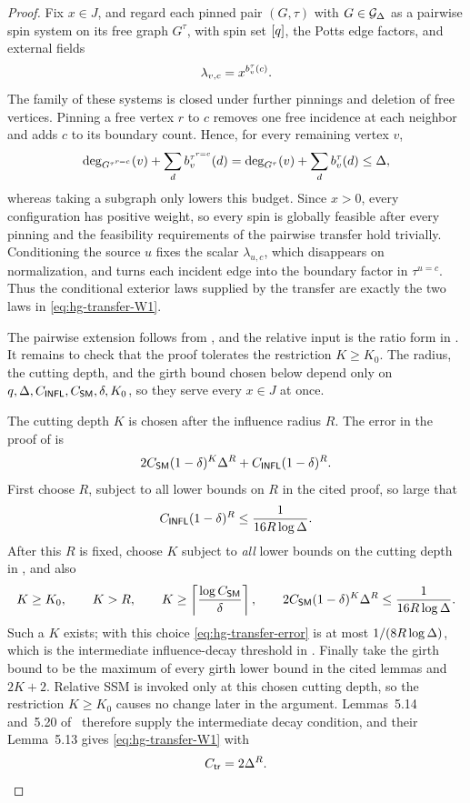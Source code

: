 \begin{proof}
Fix \(x\in J\), and regard each pinned pair \((G,\tau)\) with \(G\in\mathcal{G}_{\Delta}\) as
a pairwise spin system on its free graph \(G^\tau\), with spin set
\([q]\), the Potts edge factors, and external fields
\[
  \lambda_{v,c}=x^{b_v^\tau(c)}.
\]
The family of these systems is closed under further pinnings and deletion of
free vertices.  Pinning a free vertex $r$ to $c$ removes one free incidence at
each neighbor and adds $c$ to its boundary count.  Hence, for every remaining
vertex $v$,
\[
  \deg_{G^{\tau^{r=c}}}(v)
    +\sum_db_v^{\tau^{r=c}}(d)
  =\deg_{G^\tau}(v)+\sum_db_v^\tau(d)
  \le\Delta,
\]
whereas taking a subgraph only lowers this budget.  Since \(x>0\), every
configuration has positive weight, so every spin is globally feasible after
every pinning and the feasibility requirements of the pairwise transfer hold
trivially.  Conditioning the source \(u\) fixes the scalar
\(\lambda_{u,c}\), which disappears on normalization, and turns each incident
edge into the boundary factor in \(\tau^{u=c}\).  Thus the conditional
exterior laws supplied by the transfer are exactly the two laws in
\eqref{eq:hg-transfer-W1}.

The pairwise extension follows from \cite[Remark~5.11]{CLMM2023}, and the
relative input is the ratio form in
\cite[Definition~5.7]{CLMM2023}.  It remains to check that the proof tolerates
the restriction \(K\ge K_0\).  The radius, the cutting depth, and the girth
bound chosen below depend only on
\(q,\Delta,C_{\mathsf{INFL}},C_{\mathsf{SM}},\delta,K_0\), so they serve every
\(x\in J\) at once.

The cutting depth \(K\) is chosen after the influence radius \(R\).  The error
in the proof of \cite[Lemma~5.14]{CLMM2023} is
\begin{equation}
  2C_{\mathsf{SM}}(1-\delta)^K\Delta^R
  +C_{\mathsf{INFL}}(1-\delta)^R.
  \label{eq:hg-transfer-error}
\end{equation}
First choose $R$, subject to all lower bounds on $R$ in the cited proof, so
large that
\[
 C_{\mathsf{INFL}}(1-\delta)^R
 \le\frac1{16R\log\Delta}.
\]
After this $R$ is fixed, choose $K$ subject to \emph{all} lower bounds on the
cutting depth in \cite[Lemmas~5.14 and~5.20]{CLMM2023}, and also
\[
 K\ge K_0,\qquad K>R,\qquad
 K\ge\left\lceil\frac{\log C_{\mathsf{SM}}}{\delta}\right\rceil,\qquad
 2C_{\mathsf{SM}}(1-\delta)^K\Delta^R
 \le\frac1{16R\log\Delta}.
\]
Such a $K$ exists; with this choice \eqref{eq:hg-transfer-error} is at most
$1/(8R\log\Delta)$, which is the intermediate influence-decay threshold in
\cite[Lemma~5.14]{CLMM2023}.
Finally take the girth bound to be the maximum of every girth lower bound in
the cited lemmas and $2K+2$.  Relative SSM is invoked only at this chosen
cutting depth, so the restriction \(K\ge K_0\) causes no change later in the
argument.  Lemmas~5.14 and~5.20 of~\cite{CLMM2023} therefore supply the
intermediate decay condition, and their Lemma~5.13 gives
\eqref{eq:hg-transfer-W1} with
\[
 C_{\mathsf{tr}}=2\Delta^R.
\]
\end{proof}


